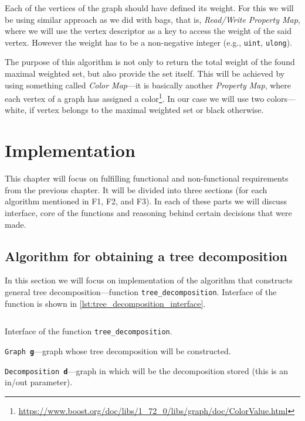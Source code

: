 \documentclass[thesis=B,english]{FITthesis}[2019/03/21]
\begin{document}
Each of the vertices of the graph should have defined its weight. For this we will be using similar approach as we did with bags, that is, \emph{Read/Write Property Map}, where we will use the vertex descriptor as a key to access the weight of the said vertex. However the weight has to be a non-negative integer (e.g., \texttt{uint}, \texttt{ulong}).

The purpose of this algorithm is not only to return the total weight of the found maximal weighted set, but also provide the set itself. This will be achieved by using something called \emph{Color Map}---it is basically another \emph{Property Map}, where each vertex of a graph has assigned a color\footnote{\url{https://www.boost.org/doc/libs/1_72_0/libs/graph/doc/ColorValue.html}}. In our case we will use two colors---white, if vertex belongs to the maximal weighted set or black otherwise.

\chapter{Implementation}\label{chap:implementation}
This chapter will focus on fulfilling functional and non-functional requirements from the previous chapter. It will be divided into three sections (for each algorithm mentioned in F1, F2, and F3). In each of these parts we will discuss interface, core of the functions and reasoning behind certain decisions that were made.

\section{Algorithm for obtaining a tree decomposition}\label{sec:td_implementation}
In this section we will focus on implementation of the algorithm that constructs general tree decomposition---function \texttt{tree\_decomposition}. Interface of the function is shown in \autoref{lst:tree_decomposition_interface}.

\begin{listing}[H]
	\inputminted[tabsize=2,breaklines,bgcolor=codebg]{c++}{snippets/tree_decomposition_interface.m}
	\caption[Interface of the function \texttt{tree\_decomposition}]{Interface of the function \texttt{tree\_decomposition}.}
	\label{lst:tree_decomposition_interface}
\end{listing}

\noindent\texttt{Graph \textbf{g}}---graph whose tree decomposition will be constructed.

\noindent\texttt{Decomposition \textbf{d}}---graph in which will be the decomposition stored (this is an in/out parameter).
\end{document}
